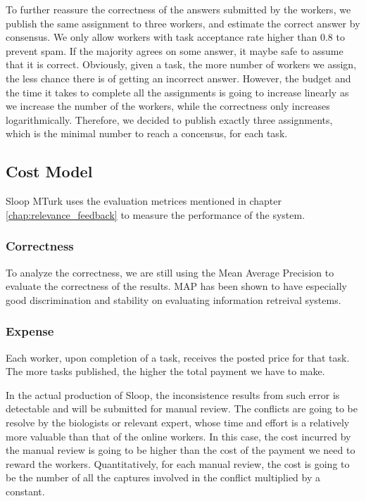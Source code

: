 To further reassure the correctness of the answers submitted by the workers, we
publish the same assignment to three workers, and estimate the correct answer
by consensus. We only allow workers with task acceptance rate higher than 0.8
to prevent spam. If the majority agrees on some answer, it maybe safe to assume
that it is correct. Obviously, given a task, the more number of workers we
assign, the less chance there is of getting an incorrect answer. However, the
budget and the time it takes to complete all the assignments is going to
increase linearly as we increase the number of the workers, while the
correctness only increases logarithmically. Therefore, we decided to publish
exactly three assignments, which is the minimal number to reach a concensus,
for each task.

\subsection{Cost Model}

Sloop MTurk uses the evaluation metrices mentioned in chapter
\ref{chap:relevance_feedback} to measure the performance of the system.

\subsubsection{Correctness}

To analyze the correctness, we are still using the Mean Average Precision to
evaluate the correctness of the results. MAP has been shown to have especially
good discrimination and stability on evaluating information retreival
systems\cite{manning2008introduction}.

\subsubsection{Expense}

Each worker, upon completion of a task, receives the posted price for that
task. The more tasks published, the higher the total payment we have to make.

In the actual production of Sloop, the inconsistence results from such error is
detectable and will be submitted for manual review. The conflicts are going to
be resolve by the biologists or relevant expert, whose time and effort is a
relatively more valuable than that of the online workers. In this case, the
cost incurred by the manual review is going to be higher than the cost of the
payment we need to reward the workers. Quantitatively, for each manual review,
the cost is going to be the number of all the captures involved in the conflict
multiplied by a constant.
